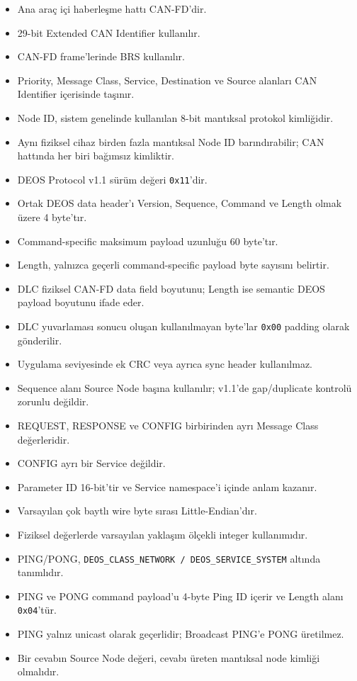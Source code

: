 \documentclass[a4paper,10pt]{article}
\newcommand{\hex}[1]{\texttt{0x#1}}
\newcommand{\code}[1]{\texttt{#1}}
\begin{document}
\begin{itemize}
    \item Ana araç içi haberleşme hattı CAN-FD'dir.
    \item 29-bit Extended CAN Identifier kullanılır.
    \item CAN-FD frame'lerinde BRS kullanılır.
    \item Priority, Message Class, Service, Destination ve Source alanları CAN Identifier içerisinde taşınır.
    \item Node ID, sistem genelinde kullanılan 8-bit mantıksal protokol kimliğidir.
    \item Aynı fiziksel cihaz birden fazla mantıksal Node ID barındırabilir; CAN hattında her biri bağımsız kimliktir.
    \item DEOS Protocol v1.1 sürüm değeri \hex{11}'dir.
    \item Ortak DEOS data header'ı Version, Sequence, Command ve Length olmak üzere 4 byte'tır.
    \item Command-specific maksimum payload uzunluğu 60 byte'tır.
    \item Length, yalnızca geçerli command-specific payload byte sayısını belirtir.
    \item DLC fiziksel CAN-FD data field boyutunu; Length ise semantic DEOS payload boyutunu ifade eder.
    \item DLC yuvarlaması sonucu oluşan kullanılmayan byte'lar \hex{00} padding olarak gönderilir.
    \item Uygulama seviyesinde ek CRC veya ayrıca sync header kullanılmaz.
    \item Sequence alanı Source Node başına kullanılır; v1.1'de gap/duplicate kontrolü zorunlu değildir.
    \item REQUEST, RESPONSE ve CONFIG birbirinden ayrı Message Class değerleridir.
    \item CONFIG ayrı bir Service değildir.
    \item Parameter ID 16-bit'tir ve Service namespace'i içinde anlam kazanır.
    \item Varsayılan çok baytlı wire byte sırası Little-Endian'dır.
    \item Fiziksel değerlerde varsayılan yaklaşım ölçekli integer kullanımıdır.
    \item PING/PONG, \code{DEOS\_CLASS\_NETWORK / DEOS\_SERVICE\_SYSTEM} altında tanımlıdır.
    \item PING ve PONG command payload'u 4-byte Ping ID içerir ve Length alanı \hex{04}'tür.
    \item PING yalnız unicast olarak geçerlidir; Broadcast PING'e PONG üretilmez.
    \item Bir cevabın Source Node değeri, cevabı üreten mantıksal node kimliği olmalıdır.
\end{itemize}
\end{document}

